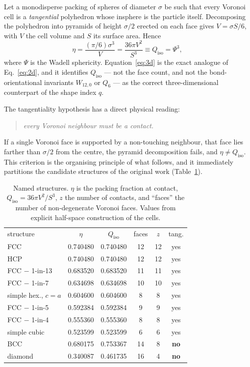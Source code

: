 \documentclass[aps,prl,twocolumn,superscriptaddress,floatfix]{revtex4-2}
\begin{document}
Let a monodisperse packing of spheres of diameter $\sigma$ be such that every
Voronoi cell is a \emph{tangential} polyhedron whose insphere is the particle
itself. Decomposing the polyhedron into pyramids of height $\sigma/2$ erected on
each face gives $V=\sigma S/6$, with $V$ the cell volume and $S$ its surface
area. Hence
\begin{equation}
\eta = \frac{(\pi/6)\sigma^3}{V} = \frac{36\pi V^2}{S^3}
     \equiv Q_{\mathrm{iso}} = \Psi^3,
\label{eq:3d}
\end{equation}
where $\Psi$ is the Wadell sphericity. Equation~\eqref{eq:3d} is the exact
analogue of Eq.~\eqref{eq:2d}, and it identifies $Q_{\mathrm{iso}}$ --- not the
face count, and not the bond-orientational invariants $W_{12,0}$ or $Q_6$ --- as
the correct three-dimensional counterpart of the shape index $q$.

The tangentiality hypothesis has a direct physical reading:
\begin{quote}
\emph{every Voronoi neighbour must be a contact.}
\end{quote}
If a single Voronoi face is supported by a non-touching neighbour, that face lies
farther than $\sigma/2$ from the centre, the pyramid decomposition fails, and
$\eta \neq Q_{\mathrm{iso}}$. This criterion is the organising principle of what
follows, and it immediately partitions the candidate structures of the original
work (Table~\ref{tab:named}).

\begin{table}[t]
\caption{Named structures. $\eta$ is the packing fraction at contact,
$Q_{\mathrm{iso}}=36\pi V^2/S^3$, $z$ the number of contacts, and ``faces'' the
number of non-degenerate Voronoi faces. Values from explicit half-space
construction of the cells.}
\label{tab:named}
\begin{ruledtabular}
\begin{tabular}{lccccc}
structure & $\eta$ & $Q_{\mathrm{iso}}$ & faces & $z$ & tang.\\
\colrule
FCC & 0.740480 & 0.740480 & 12 & 12 & yes\\
HCP & 0.740480 & 0.740480 & 12 & 12 & yes\\
FCC $-$ 1-in-13 & 0.683520 & 0.683520 & 11 & 11 & yes\\
FCC $-$ 1-in-7  & 0.634698 & 0.634698 & 10 & 10 & yes\\
simple hex., $c=a$ & 0.604600 & 0.604600 & 8 & 8 & yes\\
FCC $-$ 1-in-5  & 0.592384 & 0.592384 & 9 & 9 & yes\\
FCC $-$ 1-in-4  & 0.555360 & 0.555360 & 8 & 8 & yes\\
simple cubic & 0.523599 & 0.523599 & 6 & 6 & yes\\
BCC & 0.680175 & 0.753367 & 14 & 8 & \textbf{no}\\
diamond & 0.340087 & 0.461735 & 16 & 4 & \textbf{no}\\
\end{tabular}
\end{ruledtabular}
\end{table}
\end{document}
